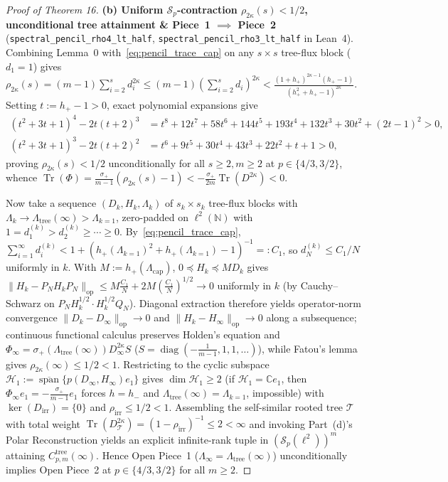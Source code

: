 \documentclass[10pt,letterpaper]{article}
\newcommand{\C}{\mathbb{C}}
\newcommand{\N}{\mathbb{N}}
\newcommand{\Hilb}{\mathcal{H}}
\newcommand{\Sp}{\mathcal{S}_p}
\newcommand{\Tr}{\operatorname{Tr}}
\newcommand{\diag}{\operatorname{diag}}
\newcommand{\op}{\mathrm{op}}
\begin{document}
\begin{proof}[Proof of Theorem 16]
\textbf{(b) Uniform $\Sp$-contraction $\rho_{2\kappa}(s) < 1/2$, unconditional tree attainment \& Piece~1 $\implies$ Piece~2} (\texttt{spectral\_\allowbreak pencil\_rho4\_lt\_half}, \texttt{spectral\_\allowbreak pencil\_rho3\_lt\_half} in Lean~4).
Combining Lemma~0 with~\eqref{eq:pencil_trace_cap} on any $s\times s$ tree-flux block ($d_1 = 1$) gives $\rho_{2\kappa}(s) = (m-1)\sum_{i=2}^s d_i^{2\kappa} \le (m-1)(\sum_{i=2}^s d_i)^{2\kappa} < \frac{(1+h_+)^{2\kappa-1}(h_+ - 1)}{(h_+^2 + h_+ - 1)^{2\kappa}}$. Setting $t := h_+ - 1 > 0$, exact polynomial expansions give
\begin{align*}
  (t^2 + 3t + 1)^4 - 2t(t+2)^3 &= t^8 + 12t^7 + 58t^6 + 144t^5 + 193t^4 + 132t^3 + 30t^2 + (2t - 1)^2 > 0, \\
  (t^2 + 3t + 1)^3 - 2t(t+2)^2 &= t^6 + 9t^5 + 30t^4 + 43t^3 + 22t^2 + t + 1 > 0,
\end{align*}
proving $\rho_{2\kappa}(s) < 1/2$ unconditionally for all $s \ge 2, m \ge 2$ at $p \in \{4/3, 3/2\}$, whence $\Tr(\Phi) = \frac{\sigma_+}{m-1}(\rho_{2\kappa}(s) - 1) < -\frac{\sigma_+}{2m}\Tr(D^{2\kappa}) < 0$.

Now take a sequence $(D_k, H_k, \Lambda_k)$ of $s_k \times s_k$ tree-flux blocks with $\Lambda_k \to \Lambda_{\mathrm{tree}}(\infty) > \Lambda_{k=1}$, zero-padded on $\ell^2(\N)$ with $1 = d_1^{(k)} > d_2^{(k)} \ge \cdots \ge 0$. By~\eqref{eq:pencil_trace_cap}, $\sum_{i=1}^\infty d_i^{(k)} < 1 + (h_+(\Lambda_{k=1})^2 + h_+(\Lambda_{k=1}) - 1)^{-1} =: C_1$, so $d_N^{(k)} \le C_1/N$ uniformly in $k$. With $M := h_+(\Lambda_{\mathrm{cap}})$, $0 \preceq H_k \preceq M D_k$ gives $\|H_k - P_N H_k P_N\|_{\op} \le M\frac{C_1}{N} + 2M(\frac{C_1}{N})^{1/2} \to 0$ uniformly in $k$ (by Cauchy--Schwarz on $P_N H_k^{1/2} \cdot H_k^{1/2} Q_N$). Diagonal extraction therefore yields operator-norm convergence $\|D_k - D_\infty\|_{\op} \to 0$ and $\|H_k - H_\infty\|_{\op} \to 0$ along a subsequence; continuous functional calculus preserves Holden's equation and $\Phi_\infty = \sigma_+(\Lambda_{\mathrm{tree}}(\infty)) D_\infty^{2\kappa} S$ ($S = \diag(-\frac{1}{m-1}, 1, 1, \dots)$), while Fatou's lemma gives $\rho_{2\kappa}(\infty) \le 1/2 < 1$. Restricting to the cyclic subspace $\Hilb_1 := \overline{\operatorname{span}}\{p(D_\infty, H_\infty)e_1\}$ gives $\dim\Hilb_1 \ge 2$ (if $\Hilb_1 = \C e_1$, then $\Phi_\infty e_1 = -\frac{\sigma_+}{m-1} e_1$ forces $h = h_-$ and $\Lambda_{\mathrm{tree}}(\infty) = \Lambda_{k=1}$, impossible) with $\ker(D_{\mathrm{irr}}) = \{0\}$ and $\rho_{\mathrm{irr}} \le 1/2 < 1$. Assembling the self-similar rooted tree $\mathcal{T}$ with total weight $\Tr(D_{\mathcal{T}}^{2\kappa}) = (1 - \rho_{\mathrm{irr}})^{-1} \le 2 < \infty$ and invoking Part~(d)'s Polar Reconstruction yields an explicit infinite-rank tuple in $(\Sp(\ell^2))^m$ attaining $C_{p,m}^{\mathrm{tree}}(\infty)$. Hence Open Piece~1 ($\Lambda_\infty = \Lambda_{\mathrm{tree}}(\infty)$) unconditionally implies Open Piece~2 at $p \in \{4/3, 3/2\}$ for all $m \ge 2$.


\end{proof}
\end{document}
